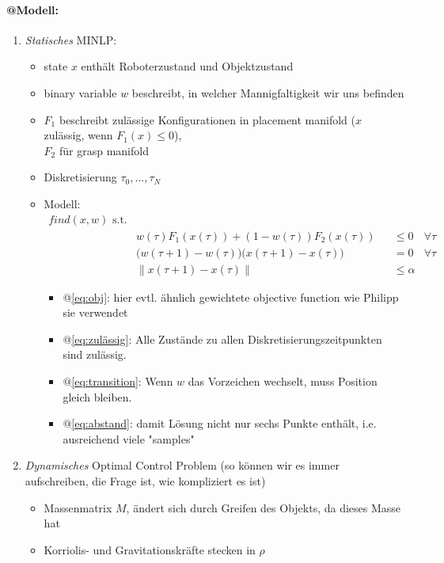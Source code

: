 \documentclass{article}
\begin{document}
\paragraph{@Modell:}
\begin{enumerate}
\item \textit{Statisches} MINLP:
	\begin{itemize}
	\item state $x$ enth\"alt Roboterzustand und Objektzustand
	\item binary variable $w$ beschreibt, in welcher Mannigfaltigkeit wir uns befinden
	\item $F_1$ beschreibt zul\"assige Konfigurationen in placement manifold ($x$ zul\"assig, wenn $F_1(x)\leq 0$),\\ $F_2$ f\"ur grasp manifold
	\item Diskretisierung $\tau_0,...,\tau_N$
	\item Modell:
	\begin{align}
	find(x,w) \text{ s.t.}&\label{eq:obj}\\
	 &w(\tau) F_1(x(\tau)) + (1-w(\tau))F_2(x(\tau)) &&\leq 0 &\forall \tau\label{eq:zulässig}\\
	 &\big(w(\tau+1)-w(\tau)\big)\big(x(\tau+1)-x(\tau)\big) &&= 0 &\forall \tau\label{eq:transition}\\
	 &\|x(\tau + 1)-x(\tau)\| &&\leq \alpha \label{eq:abstand}
	\end{align} 
		\begin{itemize}
		\item @\eqref{eq:obj}: hier evtl. \"ahnlich gewichtete objective function wie Philipp sie verwendet
		\item @\eqref{eq:zulässig}: Alle Zust\"ande zu allen Diskretisierungszeitpunkten sind zul\"assig.
		\item @\eqref{eq:transition}: Wenn $w$ das Vorzeichen wechselt, muss Position gleich bleiben.
		\item @\eqref{eq:abstand}: damit Lösung nicht nur sechs Punkte enth\"alt, i.e. ausreichend viele "samples"
		\end{itemize}
	\end{itemize}
\item \textit{Dynamisches} Optimal Control Problem (so k\"onnen wir es immer aufschreiben, die Frage ist, wie kompliziert es ist)
	\begin{itemize}
	\item Massenmatrix $M$, \"andert sich durch Greifen des Objekts, da dieses Masse hat
	\item Korriolis- und Gravitationskr\"afte stecken in $\rho$

\end{itemize}
\end{enumerate}
\end{document}
